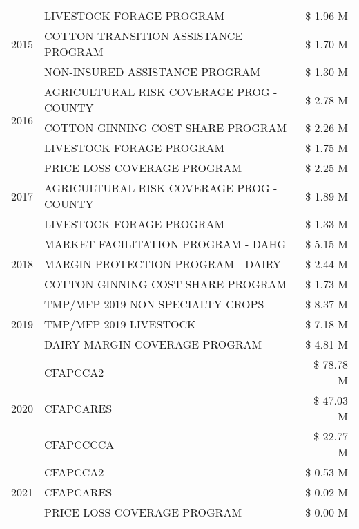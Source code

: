 \begin{tabular}{llr}
\cline{1-3}
\multirow[t]{3}{*}{2015} & LIVESTOCK FORAGE PROGRAM & \$ 1.96 M \\
 & COTTON TRANSITION ASSISTANCE PROGRAM & \$ 1.70 M \\
 & NON-INSURED ASSISTANCE PROGRAM & \$ 1.30 M \\
\cline{1-3}
\multirow[t]{3}{*}{2016} & AGRICULTURAL RISK COVERAGE PROG - COUNTY      & \$ 2.78 M \\
 & COTTON GINNING COST SHARE PROGRAM             & \$ 2.26 M \\
 & LIVESTOCK FORAGE PROGRAM                      & \$ 1.75 M \\
\cline{1-3}
\multirow[t]{3}{*}{2017} & PRICE LOSS COVERAGE PROGRAM & \$ 2.25 M \\
 & AGRICULTURAL RISK COVERAGE PROG - COUNTY & \$ 1.89 M \\
 & LIVESTOCK FORAGE PROGRAM & \$ 1.33 M \\
\cline{1-3}
\multirow[t]{3}{*}{2018} & MARKET FACILITATION PROGRAM - DAHG & \$ 5.15 M \\
 & MARGIN PROTECTION PROGRAM - DAIRY & \$ 2.44 M \\
 & COTTON GINNING COST SHARE PROGRAM & \$ 1.73 M \\
\cline{1-3}
\multirow[t]{3}{*}{2019} & TMP/MFP 2019 NON SPECIALTY CROPS & \$ 8.37 M \\
 & TMP/MFP 2019 LIVESTOCK & \$ 7.18 M \\
 & DAIRY MARGIN COVERAGE PROGRAM & \$ 4.81 M \\
\cline{1-3}
\multirow[t]{3}{*}{2020} & CFAPCCA2 & \$ 78.78 M \\
 & CFAPCARES & \$ 47.03 M \\
 & CFAPCCCCA & \$ 22.77 M \\
\cline{1-3}
\multirow[t]{3}{*}{2021} & CFAPCCA2 & \$ 0.53 M \\
 & CFAPCARES & \$ 0.02 M \\
 & PRICE LOSS COVERAGE PROGRAM & \$ 0.00 M \\
\cline{1-3}
\bottomrule
\end{tabular}
